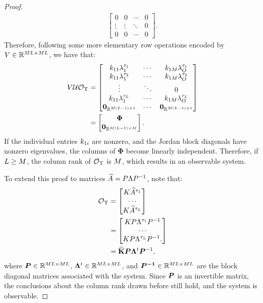 \begin{proof}
\begin{align*}
\begin{bmatrix}
	0 & 0 & \cdots & 0\\
	\vdots & \vdots & \ddots & 0\\
	0 & 0 & \cdots & 0
	\end{bmatrix}.  
	\end{align*}
	Therefore, following some more elementary row operations encoded by $V\in\mathbb{R}^{ML\times ML}$, we have that:
	\begin{align*}
	V \mathcal{U}\mathcal{O}_{\Upsilon}
	&= 
	\begin{bmatrix}
	k_{11}\lambda_1^{\tau_1} & \cdots & k_{1M}\lambda_{O}^{\tau_1}\\
	k_{11}\lambda_1^{\tau_2} & \cdots & k_{1M}\lambda_{O}^{\tau_2}\\
	\vdots & \ddots & 0\\
	k_{11}\lambda_1^{\tau_{L}} & \cdots 
	& k_{1M}\lambda_{O}^{\tau_{L}}\\
	\mathbf{0}_{\mathbb{R}^{M(L-1)\times1}} & \cdots & \mathbf{0}_{\mathbb{R}^{M(L-1)\times1}}
	\end{bmatrix}\\
	&= 
	\begin{bmatrix}
	\boldsymbol{\Phi}\\
	\mathbf{0}_{\mathbb{R}^{M(L-1)\times M}}
	\end{bmatrix}.
	\end{align*}
	If the individual entries $k_{1i}$ are nonzero, and the Jordan block diagonals have nonzero eigenvalues, the columns of $\boldsymbol\Phi$
	become linearly independent. Therefore, if $L \geq M$, the column rank of $\mathcal{O}_{\Upsilon}$ is $M$, which results in an observable system.
	
	To extend this proof to matrices $\widehat{A} = P\Lambda P^{-1}$, note that:
	\begin{align*}
	\mathcal{O}_{\Upsilon} &= 
	\begin{bmatrix}
	K \widehat{A}^{\tau_1}\\
	\cdots\\
	K \widehat{A}^{\tau_L}
	\end{bmatrix}\\
	&=
	\begin{bmatrix}
	K P\Lambda^{\tau_1}P^{-1}\\
	\cdots\\
	K P\Lambda^{\tau_L}P^{-1}.
	\end{bmatrix}\\
	&=
	\widehat{\mathbf{K}}
	\boldsymbol{P}
	\boldsymbol{\Lambda}^t
	\boldsymbol{P}^{-1},
	\end{align*} 
	where $\boldsymbol{P}\in\mathbb{R}^{ML\times ML}$, $\boldsymbol{\Lambda}^t\in\mathbb{R}^{ML\times ML}$, and
	$\boldsymbol{P^{-1}}\in\mathbb{R}^{ML\times ML}$ are the block diagonal matrices associated with the system. 
	Since $\boldsymbol{P}$ is an invertible matrix, the conclusions about the column rank drawn before still hold, and the system is observable. 
\end{proof}



